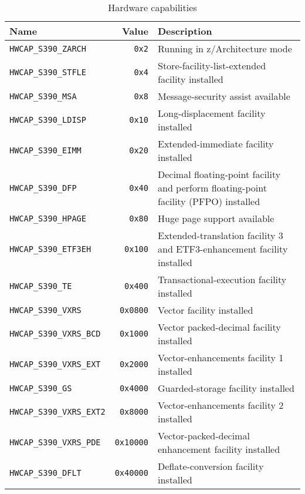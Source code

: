 \documentclass[english,11pt,twoside,toc=bib,toc=idx]{scrreprt}
\newenvironment{DIFnomarkup}{}{} %
\begin{document}
\begin{table}
  \begin{DIFnomarkup}
  \begin{tabularx}{\textwidth}{lr>{\raggedright\arraybackslash}X}
    \toprule
    Name & Value & Description \\
    \midrule
    \texttt{HWCAP\_S390\_ZARCH} & \texttt{0x2}
    & Running in z/Architecture mode \\
    \texttt{HWCAP\_S390\_STFLE} & \texttt{0x4}
    & Store-facility-list-extended facility installed \\
    \texttt{HWCAP\_S390\_MSA} & \texttt{0x8}
    & Message-security assist available \\
    \texttt{HWCAP\_S390\_LDISP} & \texttt{0x10}
    & Long-displacement facility installed \\
    \texttt{HWCAP\_S390\_EIMM} & \texttt{0x20}
    & Extended-immediate facility installed \\
    \texttt{HWCAP\_S390\_DFP} & \texttt{0x40}
    & Decimal floating-point facility and perform floating-point
    facility (PFPO) installed \\
    \texttt{HWCAP\_S390\_HPAGE} & \texttt{0x80}
    & Huge page support available \\
    \texttt{HWCAP\_S390\_ETF3EH} & \texttt{0x100}
    & Extended-translation facility 3 and ETF3-enhancement
    facility installed \\
    \texttt{HWCAP\_S390\_TE} & \texttt{0x400}
    & Transactional-execution facility installed \\
    \texttt{HWCAP\_S390\_VXRS} & \texttt{0x0800}
    & Vector facility installed \\
    \texttt{HWCAP\_S390\_VXRS\_BCD} & \texttt{0x1000}
    & Vector packed-decimal facility installed \\
    \texttt{HWCAP\_S390\_VXRS\_EXT} & \texttt{0x2000}
    & Vector-enhancements facility 1 installed \\
    \texttt{HWCAP\_S390\_GS} & \texttt{0x4000}
    & Guarded-storage facility installed \\
    \texttt{HWCAP\_S390\_VXRS\_EXT2} & \texttt{0x8000}
    & Vector-enhancements facility 2 installed \\
    \texttt{HWCAP\_S390\_VXRS\_PDE} & \texttt{0x10000}
    & Vector-packed-decimal enhancement facility installed \\
    \texttt{HWCAP\_S390\_DFLT} & \texttt{0x40000}
    & Deflate-conversion facility installed \\
    \bottomrule
  \end{tabularx}
  \end{DIFnomarkup}
  \caption{Hardware capabilities}
  \label{tab:hwcap}
\end{table}
\end{document}
